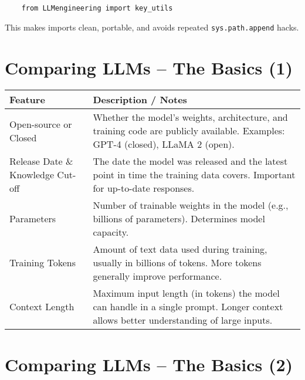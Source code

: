 \begin{tcolorbox}[colback=gray!5, colframe=gray!80!black, title=Long-Term Package Approach]
    \begin{verbatim}
    from LLMengineering import key_utils
    \end{verbatim}
\end{tcolorbox}

This makes imports clean, portable, and avoids repeated \texttt{sys.path.append} hacks.



\newpage
\section{Comparing LLMs -- The Basics (1)}
\begin{tabularx}{\textwidth}{|>{\hsize}L|>{\hsize}L|}
\hline
\textbf{Feature} & \textbf{Description / Notes} \\
\hline
Open-source or Closed & Whether the model’s weights, architecture, and training code are publicly available. Examples: GPT-4 (closed), LLaMA 2 (open). \\
\hline
Release Date \& Knowledge Cut-off & The date the model was released and the latest point in time the training data covers. Important for up-to-date responses. \\
\hline
Parameters & Number of trainable weights in the model (e.g., billions of parameters). Determines model capacity. \\
\hline
Training Tokens & Amount of text data used during training, usually in billions of tokens. More tokens generally improve performance. \\
\hline
Context Length & Maximum input length (in tokens) the model can handle in a single prompt. Longer context allows better understanding of large inputs. \\
\hline
\end{tabularx}

\vspace{1em}

\section{Comparing LLMs -- The Basics (2)}

